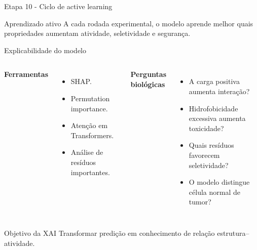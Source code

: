 \documentclass[aspectratio=169,10pt]{beamer}
\begin{document}
\begin{frame}{Etapa 10 - Ciclo de active learning}
\begin{center}
\end{center}

\vspace{0.2cm}
\begin{block}{Aprendizado ativo}
A cada rodada experimental, o modelo aprende melhor quais propriedades aumentam atividade, seletividade e segurança.
\end{block}
\end{frame}

\begin{frame}{Explicabilidade do modelo}
\begin{columns}[T]
\textbf{Ferramentas}
\begin{itemize}
  \item SHAP.
  \item Permutation importance.
  \item Atenção em Transformers.
  \item Análise de resíduos importantes.
\end{itemize}

\textbf{Perguntas biológicas}
\begin{itemize}
  \item A carga positiva aumenta interação?
  \item Hidrofobicidade excessiva aumenta toxicidade?
  \item Quais resíduos favorecem seletividade?
  \item O modelo distingue célula normal de tumor?
\end{itemize}
\end{columns}

\vspace{0.3cm}
\begin{block}{Objetivo da XAI}
Transformar predição em conhecimento de relação estrutura--atividade.
\end{block}
\end{frame}
\end{document}
